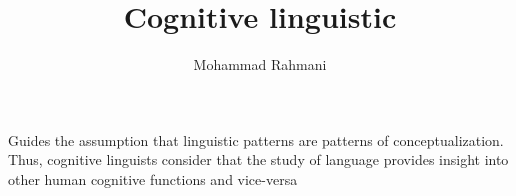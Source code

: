 \documentclass[a4paper]{article}
\title{Cognitive linguistic}
\date{}
\author{Mohammad Rahmani}
\begin{document}
    \maketitle
    Guides the assumption that linguistic patterns are patterns of conceptualization. Thus, cognitive linguists consider that the study of language provides insight into other human cognitive functions and vice-versa 
    
    
\end{document}
